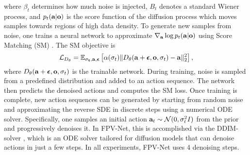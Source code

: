 where \(\beta_t\) determines how much noise is injected, $B_t$ denotes a standard Wiener process, and \(p_t(\mathbf{a} | \mathbf{o})\) is the score function of the diffusion process which moves samples towards regions of high data density. To generate new samples from noise, one trains a neural network to approximate \(\nabla_{\mathbf{a}} \log p_t(\mathbf{a} | \mathbf{o})\) using Score Matching (SM) \cite{6795935}. The SM objective is
\begin{equation}
\label{eq: denoising score matching loss}
\begin{split}
     \mathcal{L}_{D_{\theta}} = 
     \mathbb{E}_{\mathbf{\sigma_t}, \mathbf{a}, \boldsymbol{\epsilon}} \left[  \alpha (\sigma_t) \| D_{\theta}(\mathbf{a} + \boldsymbol{\epsilon}, \mathbf{o}, \sigma_t)  - \mathbf{a}  \|_2^2 \right],
     \end{split}
\end{equation}
where $D_{\theta}(\mathbf{a} + \boldsymbol{\epsilon}, \mathbf{o}, \sigma_t)$ is the trainable network. During training, noise is sampled from a predefined distribution and added to an action sequence. The network then predicts the denoised actions and computes the SM loss.
Once training is complete, new action sequences can be generated by starting from random noise and approximating the reverse SDE in discrete steps using a numerical ODE solver. Specifically, one samples an initial action $\mathbf{a}_t \sim \mathcal{N}(0, \sigma_t^2 I)$ from the prior and progressively denoises it. In FPV-Net, this is accomplished via the DDIM-solver \cite{song2020denoising}, which is an ODE solver tailored for diffusion models that can denoise actions in just a few steps. In all experiments, FPV-Net uses 4 denoising steps.






